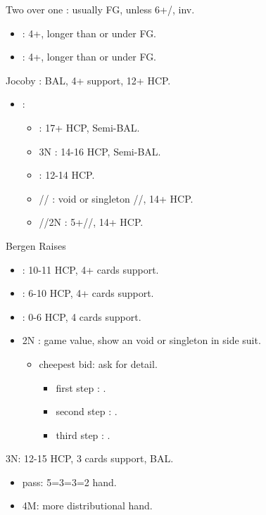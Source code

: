 \documentclass[12pt,twoside,a5paper]{report}%
\begin{document}
	Two over one : usually FG, unless 6+\cl{}/\di{}, inv.
	\begin{itemize}
	\renewcommand{\labelitemi}{}
	\item {} : 4+\he{}, \he{} longer than \di{} or under FG.
	\item {} : 4+\sp{}, \sp{} longer than \di{} or under FG.
	\end{itemize}

	Jocoby : BAL, 4+\he{} support, 12+ HCP.
	\begin{itemize}
	\renewcommand{\labelitemi}{}
	\item {}:
		\begin{itemize}
		\renewcommand{\labelitemi}{--}
		\item {} : 17+ HCP, Semi-BAL.
		\item 3N : 14-16 HCP, Semi-BAL.
		\item {} : 12-14 HCP.
		\item {}// : void or singleton //, 14+ HCP.
		\item {}//2N : 5+//, 14+ HCP.
		\end{itemize}
	\end{itemize}

	Bergen Raises
	\begin{itemize}
	\renewcommand{\labelitemi}{}
	\item {} : 10-11 HCP, 4+ cards support.
	\item {} : 6-10 HCP, 4+ cards support.
	\item {} : 0-6 HCP, 4 cards support.
	\item 2N : game value, show an void or singleton in side suit.
		\begin{itemize}
		\renewcommand{\labelitemi}{--}
		\item cheepest bid: ask for detail.
			\begin{itemize}
			\renewcommand{\labelitemi}{--}
				\item first step : \cl{}.
				\item second step : \di{}.
				\item third step : \sp{}.
			\end{itemize}
		\end{itemize}
	\end{itemize}

	3N: 12-15 HCP, 3 cards support, BAL.
		\begin{itemize}
		\renewcommand{\labelitemi}{--}
		\item pass: 5=3=3=2 hand.
		\item 4M: more distributional hand.
		\end{itemize}
\end{document}
